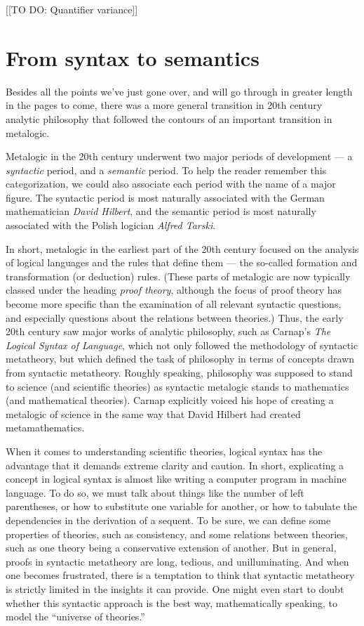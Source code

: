 [[TO DO: Quantifier variance]]




\section{From syntax to semantics}

Besides all the points we've just gone over, and will go through in
greater length in the pages to come, there was a more general
transition in 20th century analytic philosophy that followed the
contours of an important transition in metalogic.

Metalogic in the 20th century underwent two major periods of
development --- a {\it syntactic} period, and a {\it semantic} period.
To help the reader remember this categorization, we could also
associate each period with the name of a major figure.  The syntactic
period is most naturally associated with the German mathematician
\emph{David Hilbert}, and the semantic period is most naturally
associated with the Polish logician \emph{Alfred Tarski}.

In short, metalogic in the earliest part of the 20th century focused
on the analysis of logical languages and the rules that define them
--- the so-called formation and transformation (or deduction) rules.
(These parts of metalogic are now typically classed under the heading
{\it proof theory}, although the focus of proof theory has become more
specific than the examination of all relevant syntactic questions, and
especially questions about the relations between theories.)  Thus, the
early 20th century saw major works of analytic philosophy, such as
Carnap's {\it The Logical Syntax of Language}, which not only followed
the methodology of syntactic metatheory, but which defined the task of
philosophy in terms of concepts drawn from syntactic metatheory.
Roughly speaking, philosophy was supposed to stand to science (and
scientific theories) as syntactic metalogic stands to mathematics (and
mathematical theories).  Carnap explicitly voiced his hope of creating
a metalogic of science in the same way that David Hilbert had created
metamathematics.

When it comes to understanding scientific theories, logical syntax has
the advantage that it demands extreme clarity and caution.  In short,
explicating a concept in logical syntax is almost like writing a
computer program in machine language.  To do so, we must talk about
things like the number of left parentheses, or how to substitute one
variable for another, or how to tabulate the dependencies in the
derivation of a sequent.  To be sure, we can define some properties of
theories, such as consistency, and some relations between theories,
such as one theory being a conservative extension of another.  But in
general, proofs in syntactic metatheory are long, tedious, and
unilluminating.  And when one becomes frustrated, there is a
temptation to think that syntactic metatheory is strictly limited in
the insights it can provide.  One might even start to doubt whether
this syntactic approach is the best way, mathematically speaking, to
model the ``universe of theories.''

